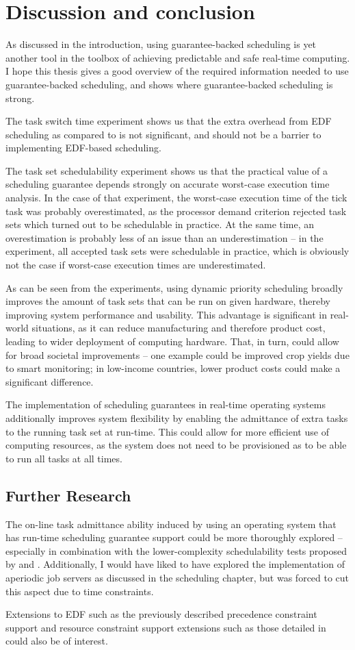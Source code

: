 \chapter{Discussion and conclusion}
As discussed in the introduction, using guarantee-backed scheduling is yet another tool in the toolbox of achieving predictable and safe real-time computing. I hope this thesis gives a good overview of the required information needed to use guarantee-backed scheduling, and shows where guarantee-backed scheduling is strong.

The task switch time experiment shows us that the extra overhead from EDF scheduling as compared to \ucosiii is not significant, and should not be a barrier to implementing EDF-based scheduling.

The task set schedulability experiment shows us that the practical value of a scheduling guarantee depends strongly on accurate worst-case execution time analysis. In the case of that experiment, the worst-case execution time of the \ucos tick task was probably overestimated, as the processor demand criterion rejected task sets which turned out to be schedulable in practice. At the same time, an overestimation is probably less of an issue than an underestimation -- in the experiment, all accepted task sets were schedulable in practice, which is obviously not the case if worst-case execution times are underestimated.

As can be seen from the experiments, using dynamic priority scheduling broadly improves the amount of task sets that can be run on given hardware, thereby improving system performance and usability. This advantage is significant in real-world situations, as it can reduce manufacturing and therefore product cost, leading to wider deployment of computing hardware. That, in turn, could allow for broad societal improvements -- one example could be improved crop yields due to smart monitoring; in low-income countries, lower product costs could make a significant difference.

The implementation of scheduling guarantees in real-time operating systems additionally improves system flexibility by enabling the admittance of extra tasks to the running task set at run-time. This could allow for more efficient use of computing resources, as the system does not need to be provisioned as to be able to run all tasks at all times.

\section{Further Research}
The on-line task admittance ability induced by using an operating system that has run-time scheduling guarantee support could be more thoroughly explored -- especially in combination with the lower-complexity schedulability tests proposed by \textcite{Albers} and \textcite{Zhang2009}. Additionally, I would have liked to have explored the implementation of aperiodic job servers as discussed in the scheduling chapter, but was forced to cut this aspect due to time constraints.

Extensions to EDF such as the previously described precedence constraint support and resource constraint support extensions such as those detailed in \textcite[\S 7]{buttazzo2011hard} could also be of interest.

